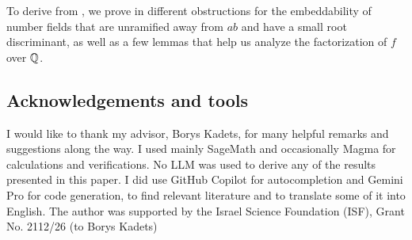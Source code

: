\documentclass[../main.tex]{subfiles}
\begin{document}
To derive  from , we prove in  different obstructions for the embeddability of number fields that are unramified away from $ab$ and have a small root discriminant, as well as a few lemmas that help us analyze the factorization of $f$ over $\mathbb{Q}$.

\subsection{Acknowledgements and tools}
I would like to thank my advisor, Borys Kadets, for many helpful remarks and suggestions along the way.
I used mainly SageMath and occasionally Magma for calculations and verifications.
No LLM was used to derive any of the results presented in this paper.
I did use GitHub Copilot for autocompletion and Gemini Pro for code generation, to find relevant literature and to translate some of it into English.
The author was supported by the Israel Science Foundation (ISF), Grant No. 2112/26 (to Borys Kadets)
\end{document}
